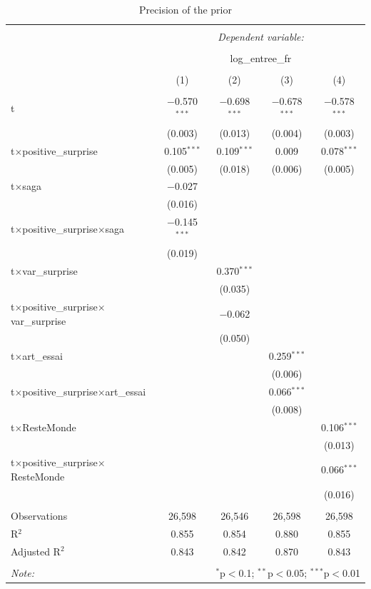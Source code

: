 \begin{table}[!htbp] \centering 
	\caption{Precision of the prior} 
	\label{precisionprior} 
	\begin{tabular}{@{\extracolsep{0pt}}lcccc} 
		\\[-1.8ex]\hline 
		\hline \\[-1.8ex] 
		& \multicolumn{4}{c}{\textit{Dependent variable:}} \\ 
		\cline{2-5} 
		\\[-1.8ex] & \multicolumn{4}{c}{log\_entree\_fr} \\ 
		\\[-1.8ex] & (1) & (2) & (3) & (4)\\ 
		\hline \\[-1.8ex] 
		t & $-$0.570$^{***}$ & $-$0.698$^{***}$ & $-$0.678$^{***}$ & $-$0.578$^{***}$ \\ 
		& (0.003) & (0.013) & (0.004) & (0.003) \\ 
		t$\times$positive\_surprise & 0.105$^{***}$ & 0.109$^{***}$ & 0.009 & 0.078$^{***}$ \\ 
		& (0.005) & (0.018) & (0.006) & (0.005) \\ 
		t$\times$saga & $-$0.027 &  &  &  \\ 
		& (0.016) &  &  &  \\ 
		t$\times$positive\_surprise$\times$saga & $-$0.145$^{***}$ &  &  &  \\ 
		& (0.019) &  &  &  \\ 
		t$\times$var\_surprise &  & 0.370$^{***}$ &  &  \\ 
		&  & (0.035) &  &  \\ 
		t$\times$positive\_surprise$\times$var\_surprise &  & $-$0.062 &  &  \\ 
		&  & (0.050) &  &  \\ 
		t$\times$art\_essai &  &  & 0.259$^{***}$ &  \\ 
		&  &  & (0.006) &  \\ 
		t$\times$positive\_surprise$\times$art\_essai &  &  & 0.066$^{***}$ &  \\ 
		&  &  & (0.008) &  \\ 
		t$\times$ResteMonde &  &  &  & 0.106$^{***}$ \\ 
		&  &  &  & (0.013) \\ 
		t$\times$positive\_surprise$\times$ResteMonde &  &  &  & 0.066$^{***}$ \\ 
		&  &  &  & (0.016) \\ 
		\hline \\[-1.8ex] 
		Observations & 26,598 & 26,546 & 26,598 & 26,598 \\ 
		R$^{2}$ & 0.855 & 0.854 & 0.880 & 0.855 \\ 
		Adjusted R$^{2}$ & 0.843 & 0.842 & 0.870 & 0.843 \\ 
		\hline 
		\hline \\[-1.8ex] 
		\textit{Note:}  & \multicolumn{4}{r}{$^{*}$p$<$0.1; $^{**}$p$<$0.05; $^{***}$p$<$0.01} \\ 
	\end{tabular} 
\end{table} 
